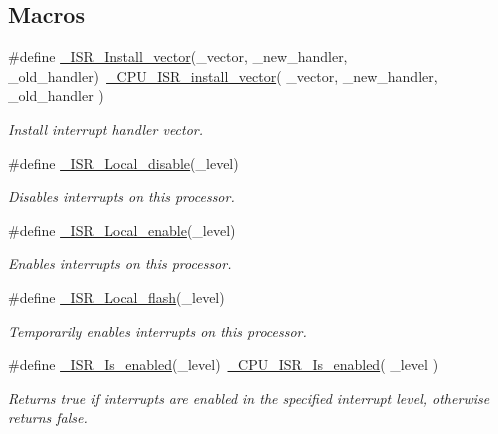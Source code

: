 \subsection*{Macros}
\begin{DoxyCompactItemize}
\item 
\#define \mbox{\hyperlink{group__RTEMSScoreISR_gae4dc7eaa448c116a2ada205e276465c1}{\+\_\+\+I\+S\+R\+\_\+\+Install\+\_\+vector}}(\+\_\+vector,  \+\_\+new\+\_\+handler,  \+\_\+old\+\_\+handler)~\mbox{\hyperlink{group__RTEMSScoreCPUARM_gaa3480454768ad843ce97909111a48a1f}{\+\_\+\+C\+P\+U\+\_\+\+I\+S\+R\+\_\+install\+\_\+vector}}( \+\_\+vector, \+\_\+new\+\_\+handler, \+\_\+old\+\_\+handler )
\begin{DoxyCompactList}\small\item\em Install interrupt handler vector. \end{DoxyCompactList}\item 
\#define \mbox{\hyperlink{group__RTEMSScoreISR_ga2a829f51f98576aa596562985e1df2fc}{\+\_\+\+I\+S\+R\+\_\+\+Local\+\_\+disable}}(\+\_\+level)
\begin{DoxyCompactList}\small\item\em Disables interrupts on this processor. \end{DoxyCompactList}\item 
\#define \mbox{\hyperlink{group__RTEMSScoreISR_ga508f5a32655cb590906a477b5a8174f1}{\+\_\+\+I\+S\+R\+\_\+\+Local\+\_\+enable}}(\+\_\+level)
\begin{DoxyCompactList}\small\item\em Enables interrupts on this processor. \end{DoxyCompactList}\item 
\#define \mbox{\hyperlink{group__RTEMSScoreISR_ga2ac9dcbae9ca059453a2042e5854f73f}{\+\_\+\+I\+S\+R\+\_\+\+Local\+\_\+flash}}(\+\_\+level)
\begin{DoxyCompactList}\small\item\em Temporarily enables interrupts on this processor. \end{DoxyCompactList}\item 
\#define \mbox{\hyperlink{group__RTEMSScoreISR_ga263f1982878c676278a5a474d02a22b7}{\+\_\+\+I\+S\+R\+\_\+\+Is\+\_\+enabled}}(\+\_\+level)~\mbox{\hyperlink{group__RTEMSScoreCPUARM_ga5254669b54a06e96ebb585fd50a02c4d}{\+\_\+\+C\+P\+U\+\_\+\+I\+S\+R\+\_\+\+Is\+\_\+enabled}}( \+\_\+level )
\begin{DoxyCompactList}\small\item\em Returns true if interrupts are enabled in the specified interrupt level, otherwise returns false. \end{DoxyCompactList}\item 

\end{DoxyCompactItemize}
